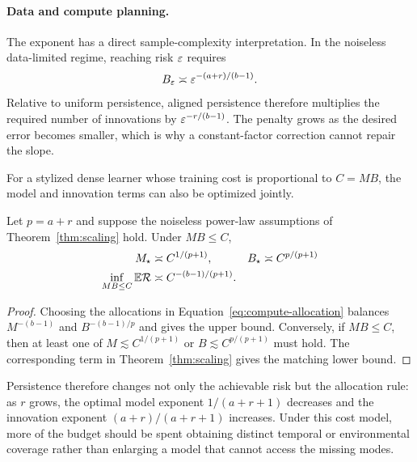 \paragraph{Data and compute planning.}
The exponent has a direct sample-complexity interpretation.  In the noiseless
data-limited regime, reaching risk $\varepsilon$ requires
\begin{equation}
B_\varepsilon\asymp \varepsilon^{-(a+r)/(b-1)}.
\label{eq:sample-complexity}
\end{equation}
Relative to uniform persistence, aligned persistence therefore multiplies the
required number of innovations by
$\varepsilon^{-r/(b-1)}$.  The penalty grows as the desired error becomes smaller,
which is why a constant-factor correction cannot repair the slope.

For a stylized dense learner whose training cost is proportional to
$C=MB$, the model and innovation terms can also be optimized jointly.

\begin{corollary}
\label{cor:compute-optimal}
Let $p=a+r$ and suppose the noiseless power-law assumptions of
Theorem~\ref{thm:scaling} hold.  Under $MB\le C$,
\begin{align}
M_\star&\asymp C^{1/(p+1)},
&B_\star&\asymp C^{p/(p+1)}
\label{eq:compute-allocation}\\
\inf_{MB\le C}\mathbb{E}\mathcal{R}
&\asymp C^{-(b-1)/(p+1)}
\label{eq:compute-rate}.
\end{align}
\end{corollary}

\begin{proof}
Choosing the allocations in Equation~\eqref{eq:compute-allocation} balances
$M^{-(b-1)}$ and $B^{-(b-1)/p}$ and gives the upper bound.  Conversely, if
$MB\le C$, then at least one of
$M\lesssim C^{1/(p+1)}$ or $B\lesssim C^{p/(p+1)}$ must hold.  The
corresponding term in Theorem~\ref{thm:scaling} gives the matching lower bound.
\end{proof}

Persistence therefore changes not only the achievable risk but the allocation
rule: as $r$ grows, the optimal model exponent $1/(a+r+1)$ decreases and the
innovation exponent $(a+r)/(a+r+1)$ increases.  Under this cost model, more of
the budget should be spent obtaining distinct temporal or environmental
coverage rather than enlarging a model that cannot access the missing modes.

